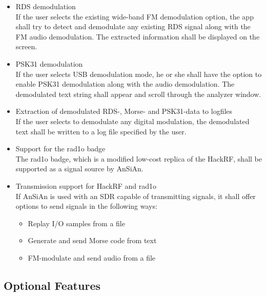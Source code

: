 \begin{itemize}
	\item \ac{RDS} demodulation \\
		If the user selects the existing wide-band \ac{FM} demodulation option,
		the app shall try to detect and demodulate any existing \ac{RDS}
		signal along with the \ac{FM} audio demodulation. The extracted information
		shall be displayed on the screen.
	\item \ac{PSK31} demodulation \\
		If the user selects \ac{USB} demodulation mode, he or she shall have
		the option to enable \ac{PSK31} demodulation along with the audio
		demodulation.  The demodulated text string shall appear and scroll
		through the analyzer window.
	\item Extraction of demodulated \ac{RDS}-, Morse- and \ac{PSK31}-data to logfiles \\
		If the user selects to demodulate any digital modulation, the demodulated
		text shall be written to a log file specified by the user.
	\item Support for the rad1o badge \\
		The rad1o badge, which is a modified low-cost replica of the HackRF,
		shall be supported as a signal source by \ac{AnSiAn}.
	\item Transmission support for HackRF and rad1o \\
		If \ac{AnSiAn} is used with an \ac{SDR} capable of transmitting signals,
		it shall offer options to send signals in the following ways:
		\begin{itemize}
			\item Replay I/O samples from a file
			\item Generate and send Morse code from text
			\item FM-modulate and send audio from a file
		\end{itemize}
\end{itemize}

\subsection{Optional Features}

